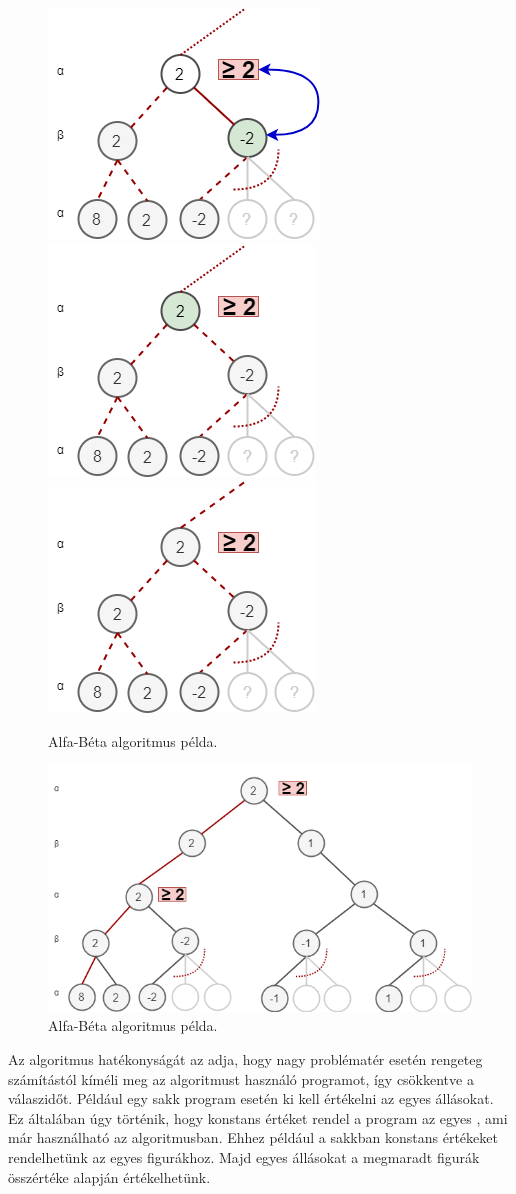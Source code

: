 \documentclass[12pt,margin=0px]{article}
\begin{document}
{    \begin{figure}[H]
		\centering
        \includegraphics[width=0.32\linewidth]{img/alphabeta_08.png}
        \includegraphics[width=0.32\linewidth]{img/alphabeta_09.png}
        \includegraphics[width=0.32\linewidth]{img/alphabeta_10.png}
		\caption{Alfa-Béta algoritmus példa.}
		\label{fig:alphabetafour}
	\end{figure}

    \begin{figure}[H]
		\centering
        \includegraphics[width=0.72\linewidth]{img/alphabeta_end.png}
		\caption{Alfa-Béta algoritmus példa.}
		\label{fig:alphabetaend}
	\end{figure}

    \noindent Az algoritmus hatékonyságát az adja, hogy nagy problématér esetén rengeteg számítástól kíméli meg az algoritmust használó programot, így csökkentve a válaszidőt. Például egy sakk program esetén ki kell értékelni az egyes állásokat. Ez általában úgy történik, hogy konstans értéket rendel a program az egyes , ami már használható az algoritmusban. Ehhez például a sakkban konstans értékeket rendelhetünk az egyes figurákhoz. Majd egyes állásokat a megmaradt figurák összértéke alapján értékelhetünk.

}
\end{document}
